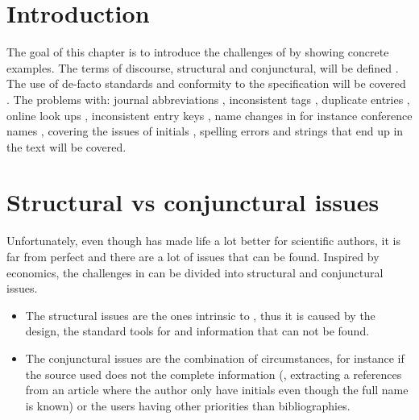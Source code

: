 
\section{Introduction}
The goal of this chapter is to introduce the challenges of {\bibtex}
by showing concrete examples.  The terms of discourse, structural and
conjunctural, will be defined
.  The use of de-facto
standards and conformity to the {\bibtex} specification will be
covered .  The problems with: journal
abbreviations , inconsistent tags
, duplicate entries
, online look ups
, inconsistent entry keys
, name changes in for instance
conference names , covering the
issues of initials , spelling errors
 and {\bibtex} strings that end up in
the text  will be covered.

\section{Structural vs conjunctural issues}
\label{sec:problems_structural_conjunctural}

Unfortunately, even though {\bibtex} has made life a lot better for
scientific authors, it is far from perfect and there are a lot of
issues that can be found.  Inspired by economics, the challenges in
{\bibtex} can be divided into structural and conjunctural issues. 

\begin{itemize}
\item The structural issues are the ones intrinsic to {\bibtex}, thus
  it is caused by the design, the standard tools for {\bibtex} and
  information that can not be found.

\item The conjunctural issues are the combination of circumstances,
  for instance if the source used does not the complete information
  (\eg, extracting a references from an article where the author only
  have initials even though the full name is known) or the users
  having other priorities than bibliographies.
\end{itemize}

